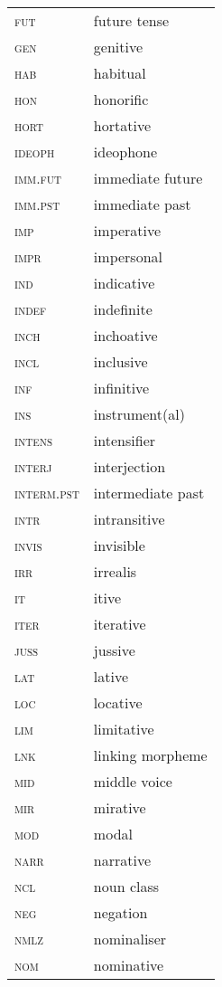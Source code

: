 \begin{multicols}{2}
\begin{tabular}{@{}lp{4cm}} 
\textsc{fut}&future tense\\
\textsc{gen}&genitive\\
\textsc{hab}&habitual\\
\textsc{hon}&honorific\\
\textsc{hort}&hortative\\
\textsc{ideoph}&ideophone\\
\textsc{imm}.\textsc{fut}&immediate future\\
\textsc{imm}.\textsc{pst}&immediate past\\
\textsc{imp}&imperative\\
\textsc{impr} & impersonal\\
\textsc{ind}&indicative\\
\textsc{indef}&indefinite\\
\textsc{inch}&inchoative\\
\textsc{incl}&inclusive\\
\textsc{inf}&infinitive\\
\textsc{ins}&instrument(al)\\
\textsc{intens}&intensifier\\
\textsc{interj}&interjection\\
\textsc{interm}.\textsc{pst}&intermediate past\\
\textsc{intr}&intransitive\\
\textsc{invis}&invisible\\
\textsc{irr}&irrealis\\
\textsc{it}&itive\\
\textsc{iter}&iterative\\
\textsc{juss}&jussive\\
\textsc{lat}&lative\\
\textsc{loc} &locative\\
\textsc{lim} & limitative\\
\textsc{lnk}&linking morpheme\\
\textsc{mid}&middle voice\\
\textsc{mir}&mirative\\
\textsc{mod}&modal\\
\textsc{narr}&narrative\\
\textsc{ncl} & noun class\\
\textsc{neg}&negation\\
\textsc{nmlz}&nominaliser\\
\textsc{nom}&nominative\\
\end{tabular}


\end{multicols}
